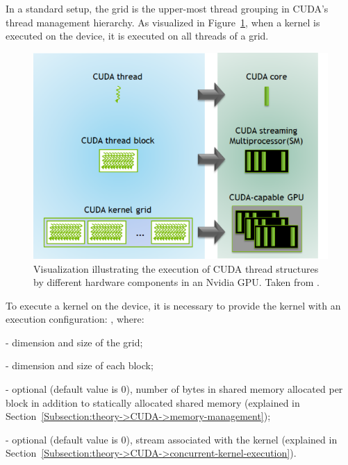 In a standard setup, the grid is the upper-most thread grouping in CUDA's thread management hierarchy.
As visualized in Figure~\ref{Figure:theory->CUDA->thread-management->thread-structures-executed-by-hardware}, when a kernel is executed on the device, it is executed on all threads of a grid.

\begin{figure}[ht!]
	\centering
	\includegraphics[width=12cm, keepaspectratio]{images/ch01/CUDA_structures_executed_by_hardware.png}
	\caption{Visualization illustrating the execution of CUDA thread structures by different hardware components in an Nvidia GPU.
		Taken from  \cite{Gupta26June2020}.
	}
	\label{Figure:theory->CUDA->thread-management->thread-structures-executed-by-hardware}
\end{figure}

To execute a kernel on the device, it is necessary to provide the kernel with an execution configuration: , where:
\begin{tight_itemize}
	\item {} - dimension and size of the grid;
	\item {} - dimension and size of each block;
	\item {} - optional (default value is 0), number of bytes in shared memory allocated per block in addition to statically allocated shared memory (explained in Section~\ref{Subsection:theory->CUDA->memory-management});
	\item {} - optional (default value is 0), stream associated with the kernel (explained in Section~\ref{Subsection:theory->CUDA->concurrent-kernel-execution}).
\end{tight_itemize}

